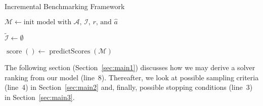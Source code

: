 \documentclass[runningheads]{llncs}
\begin{document}
\begin{algorithm}
  \caption{Incremental Benchmarking Framework}
  \label{algALBenchmark}


  $\mathcal{M} \leftarrow \textrm{init model with $\mathcal{A}$, $\mathcal{I}$, $r$, and $\hat{a}$}$
  
  $\tilde{\mathcal{I}} \leftarrow \emptyset$


  $\operatorname{score}\!\left(\right) \leftarrow \operatorname{predictScores}\!\left(\mathcal{M}\right)$

\end{algorithm}

The following section (Section~\ref{sec:main1}) discusses how we may derive a solver ranking from our model (line~8).
Thereafter, we look at possible sampling criteria (line~4) in Section~\ref{sec:main2} and, finally, possible stopping conditions (line~3) in Section~\ref{sec:main3}.
\end{document}
